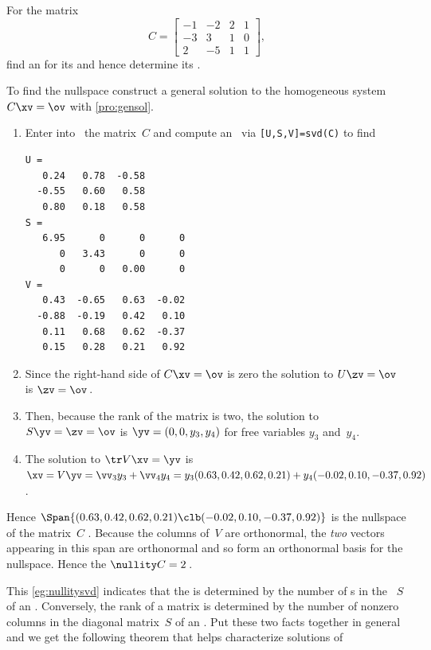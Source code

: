 \begin{example} \label{eg:nullitysvd}
For the matrix
\begin{equation*}
C=\begin{bmatrix} -1&-2&2&1
\\-3&3&1&0
\\2&-5&1&1 \end{bmatrix},
\end{equation*}
find an  for its  and hence determine its .
\begin{solution} 
To find the nullspace construct a general solution to the homogeneous system \(C\xv=\ov\) with \cref{pro:gensol}.
\begin{enumerate}
\item Enter  into \script\ the matrix~\(C\) and compute an \svd\ via \verb|[U,S,V]=svd(C)| to find \twodp
\setbox\ajrqrbox\hbox{}%
\marginajrbox%
\begin{verbatim}
U =
   0.24   0.78  -0.58
  -0.55   0.60   0.58
   0.80   0.18   0.58
S =
   6.95      0      0      0
      0   3.43      0      0
      0      0   0.00      0
V =
   0.43  -0.65   0.63  -0.02
  -0.88  -0.19   0.42   0.10
   0.11   0.68   0.62  -0.37
   0.15   0.28   0.21   0.92
\end{verbatim}
\item Since the right-hand side of \(C\xv=\ov\) is zero the solution to \(U\zv=\ov\) is \(\zv=\ov\)\,.
\item Then, because the rank of the matrix is two, the solution to \(S\yv=\zv=\ov\) is \(\yv=(0,0,y_3,y_4)\) for free variables \(y_3\) and~\(y_4\).
\item The solution to \(\tr V\xv=\yv\) is \(\sloppy\xv=V\yv=\vv_3y_3+\vv_4y_4
=y_3(0.63,0.42,0.62,0.21)+y_4(-0.02,0.10,-0.37,0.92)\).
\end{enumerate}
Hence  \(\Span\{(0.63,0.42,0.62,0.21)\clb (-0.02,0.10,-0.37,0.92)\}\) is the nullspace of the matrix~\(C\) \twodp.
Because the columns of~\(V\) are orthonormal, the \emph{two} vectors appearing in this span are orthonormal and so form an orthonormal basis for the nullspace.
Hence the \(\nullity C=2\)\,.
\end{solution}
\end{example}



This \cref{eg:nullitysvd} indicates that the  is determined by the number of s in the ~\(S\) of an \svd.
Conversely, the rank of a matrix is determined by the number of nonzero columns in the diagonal matrix~\(S\) of an \svd.
Put these two facts together in general and we get the following theorem that helps characterize solutions of 





